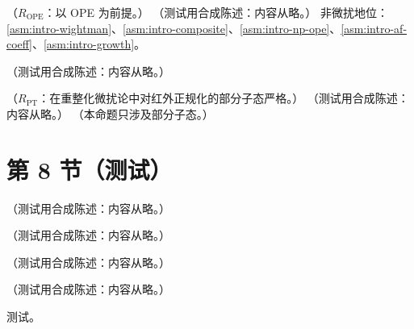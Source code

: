 \begin{corollary}\label{cor:dis-scaling}
（$R_{\mathrm{OPE}}$：以 OPE 为前提。）
（测试用合成陈述：内容从略。）
非微扰地位：\cref{asm:intro-wightman}、\cref{asm:intro-composite}、\cref{asm:intro-np-ope}、\cref{asm:intro-af-coeff}、\cref{asm:intro-growth}。
\end{corollary}

\begin{example}[$n=2$：能动张量]\label{ex:dis-n2}
（测试用合成陈述：内容从略。）
\end{example}

\begin{proposition}\label{prop:dis-c-oneloop}
（$R_{\mathrm{PT}}$：在重整化微扰论中对红外正规化的部分子态严格。）
（测试用合成陈述：内容从略。）
（本命题只涉及部分子态。）
\end{proposition}

\section{第 8 节（测试）}\label{sec:dis-xspace}

\begin{example}[单圈 OPE 检验]\label{ex:dis-oneloop-ope}
（测试用合成陈述：内容从略。）
\end{example}

\begin{remark}\label{rem:dis-uniqueness}
（测试用合成陈述：内容从略。）
\end{remark}

\begin{remark}[矩的 $O(1/Q^2)$ 不蕴含逐点 $O(1/Q^2)$]\label{rem:dis-nonuniform}
（测试用合成陈述：内容从略。）
\end{remark}

\begin{proposition}\label{prop:dis-light-cone}
（测试用合成陈述：内容从略。）
\end{proposition}
\begin{proofsketch}测试。\end{proofsketch}
